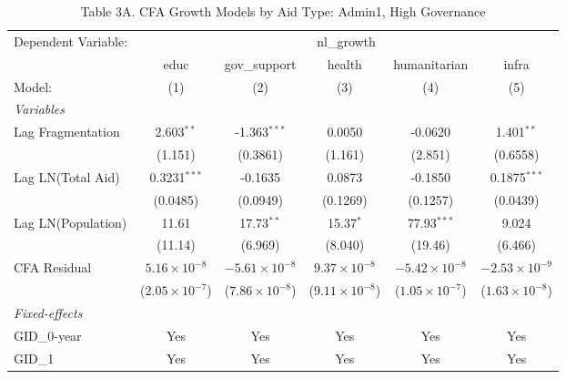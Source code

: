 \begin{table}[htbp]
   \caption{Table 3A. CFA Growth Models by Aid Type: Admin1, High Governance}
   \centering
   \begin{tabular}{lccccc}
      \tabularnewline \midrule \midrule
      Dependent Variable: & \multicolumn{5}{c}{nl\_growth}\\
                         & educ                    & gov\_support            & health                  & humanitarian            & infra \\   
      Model:             & (1)                     & (2)                     & (3)                     & (4)                     & (5)\\  
      \midrule
      \emph{Variables}\\
      Lag Fragmentation  & 2.603$^{**}$            & -1.363$^{***}$          & 0.0050                  & -0.0620                 & 1.401$^{**}$\\   
                         & (1.151)                 & (0.3861)                & (1.161)                 & (2.851)                 & (0.6558)\\   
      Lag LN(Total Aid)  & 0.3231$^{***}$          & -0.1635                 & 0.0873                  & -0.1850                 & 0.1875$^{***}$\\   
                         & (0.0485)                & (0.0949)                & (0.1269)                & (0.1257)                & (0.0439)\\   
      Lag LN(Population) & 11.61                   & 17.73$^{**}$            & 15.37$^{*}$             & 77.93$^{***}$           & 9.024\\   
                         & (11.14)                 & (6.969)                 & (8.040)                 & (19.46)                 & (6.466)\\   
      CFA Residual       & $5.16\times 10^{-8}$    & $-5.61\times 10^{-8}$   & $9.37\times 10^{-8}$    & $-5.42\times 10^{-8}$   & $-2.53\times 10^{-9}$\\    
                         & ($2.05\times 10^{-7}$)  & ($7.86\times 10^{-8}$)  & ($9.11\times 10^{-8}$)  & ($1.05\times 10^{-7}$)  & ($1.63\times 10^{-8}$)\\    
      \midrule
      \emph{Fixed-effects}\\
      GID\_0-year        & Yes                     & Yes                     & Yes                     & Yes                     & Yes\\  
      GID\_1             & Yes                     & Yes                     & Yes                     & Yes                     & Yes\\  

\end{tabular}
\end{table}
